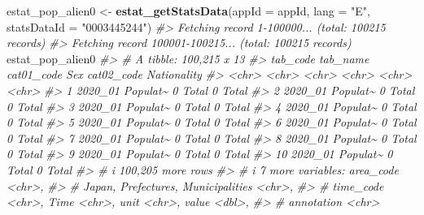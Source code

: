 \documentclass[
  xelatex, ja=standard]{bxjsbook}
\newenvironment{Shaded}{\begin{snugshade}}{\end{snugshade}}
\newcommand{\AttributeTok}[1]{\textcolor[rgb]{0.13,0.29,0.53}{#1}}
\newcommand{\CommentTok}[1]{\textcolor[rgb]{0.56,0.35,0.01}{\textit{#1}}}
\newcommand{\FunctionTok}[1]{\textcolor[rgb]{0.13,0.29,0.53}{\textbf{#1}}}
\newcommand{\NormalTok}[1]{#1}
\newcommand{\OtherTok}[1]{\textcolor[rgb]{0.56,0.35,0.01}{#1}}
\newcommand{\StringTok}[1]{\textcolor[rgb]{0.31,0.60,0.02}{#1}}
\theoremstyle{definition}
\theoremstyle{definition}
\theoremstyle{definition}
\theoremstyle{definition}
\theoremstyle{remark}
\begin{document}
\begin{Shaded}
\begin{Highlighting}[]
\NormalTok{estat\_pop\_alien0 }\OtherTok{\textless{}{-}} \FunctionTok{estat\_getStatsData}\NormalTok{(}\AttributeTok{appId =}\NormalTok{ appId, }\AttributeTok{lang =} \StringTok{"E"}\NormalTok{, }\AttributeTok{statsDataId =} \StringTok{"0003445244"}\NormalTok{)}
\CommentTok{\#\textgreater{} Fetching record 1{-}100000... (total: 100215 records)}
\CommentTok{\#\textgreater{} Fetching record 100001{-}100215... (total: 100215 records)}
\NormalTok{estat\_pop\_alien0}
\CommentTok{\#\textgreater{} \# A tibble: 100,215 x 13}
\CommentTok{\#\textgreater{}    tab\_code tab\_name cat01\_code Sex   cat02\_code Nationality}
\CommentTok{\#\textgreater{}    \textless{}chr\textgreater{}    \textless{}chr\textgreater{}    \textless{}chr\textgreater{}      \textless{}chr\textgreater{} \textless{}chr\textgreater{}      \textless{}chr\textgreater{}      }
\CommentTok{\#\textgreater{}  1 2020\_01  Populat\textasciitilde{} 0          Total 0          Total      }
\CommentTok{\#\textgreater{}  2 2020\_01  Populat\textasciitilde{} 0          Total 0          Total      }
\CommentTok{\#\textgreater{}  3 2020\_01  Populat\textasciitilde{} 0          Total 0          Total      }
\CommentTok{\#\textgreater{}  4 2020\_01  Populat\textasciitilde{} 0          Total 0          Total      }
\CommentTok{\#\textgreater{}  5 2020\_01  Populat\textasciitilde{} 0          Total 0          Total      }
\CommentTok{\#\textgreater{}  6 2020\_01  Populat\textasciitilde{} 0          Total 0          Total      }
\CommentTok{\#\textgreater{}  7 2020\_01  Populat\textasciitilde{} 0          Total 0          Total      }
\CommentTok{\#\textgreater{}  8 2020\_01  Populat\textasciitilde{} 0          Total 0          Total      }
\CommentTok{\#\textgreater{}  9 2020\_01  Populat\textasciitilde{} 0          Total 0          Total      }
\CommentTok{\#\textgreater{} 10 2020\_01  Populat\textasciitilde{} 0          Total 0          Total      }
\CommentTok{\#\textgreater{} \# i 100,205 more rows}
\CommentTok{\#\textgreater{} \# i 7 more variables: area\_code \textless{}chr\textgreater{},}
\CommentTok{\#\textgreater{} \#   \textasciigrave{}Japan, Prefectures, Municipalities\textasciigrave{} \textless{}chr\textgreater{},}
\CommentTok{\#\textgreater{} \#   time\_code \textless{}chr\textgreater{}, Time \textless{}chr\textgreater{}, unit \textless{}chr\textgreater{}, value \textless{}dbl\textgreater{},}
\CommentTok{\#\textgreater{} \#   annotation \textless{}chr\textgreater{}}
\end{Highlighting}
\end{Shaded}
\end{document}
